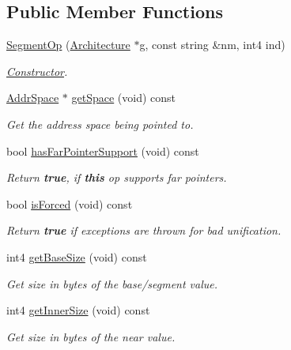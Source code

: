 \subsection*{Public Member Functions}
\begin{DoxyCompactItemize}
\item 
\mbox{\hyperlink{class_segment_op_ad7459a581b241b35100f9fe260f0509f}{Segment\+Op}} (\mbox{\hyperlink{class_architecture}{Architecture}} $\ast$g, const string \&nm, int4 ind)
\begin{DoxyCompactList}\small\item\em \mbox{\hyperlink{class_constructor}{Constructor}}. \end{DoxyCompactList}\item 
\mbox{\hyperlink{class_addr_space}{Addr\+Space}} $\ast$ \mbox{\hyperlink{class_segment_op_aad3d01eb19ee086071c27d3c60be0f89}{get\+Space}} (void) const
\begin{DoxyCompactList}\small\item\em Get the address space being pointed to. \end{DoxyCompactList}\item 
bool \mbox{\hyperlink{class_segment_op_adeed973d1e49c68202121f4173150e31}{has\+Far\+Pointer\+Support}} (void) const
\begin{DoxyCompactList}\small\item\em Return {\bfseries{true}}, if {\bfseries{this}} op supports far pointers. \end{DoxyCompactList}\item 
bool \mbox{\hyperlink{class_segment_op_aacb606ca438d1a660222777c04d25d84}{is\+Forced}} (void) const
\begin{DoxyCompactList}\small\item\em Return {\bfseries{true}} if exceptions are thrown for bad unification. \end{DoxyCompactList}\item 
int4 \mbox{\hyperlink{class_segment_op_adb895dfc740733c7106f3752bc4c6c1c}{get\+Base\+Size}} (void) const
\begin{DoxyCompactList}\small\item\em Get size in bytes of the base/segment value. \end{DoxyCompactList}\item 
int4 \mbox{\hyperlink{class_segment_op_a5b186649dadd3ed754fdfe26ba84c96b}{get\+Inner\+Size}} (void) const
\begin{DoxyCompactList}\small\item\em Get size in bytes of the near value. \end{DoxyCompactList}\item 

\end{DoxyCompactItemize}
